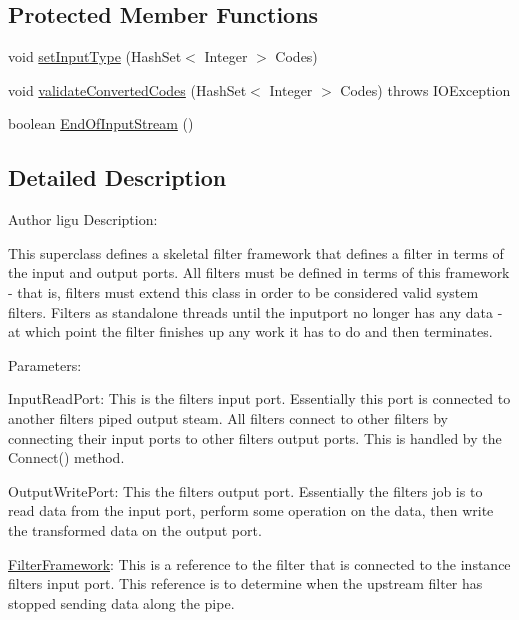 \subsection*{Protected Member Functions}
\begin{DoxyCompactItemize}
\item 
void \hyperlink{class_system_b_1_1_filter_framework_afa14d2ab9f4041b5be320ddc5ee7d08b}{set\+Input\+Type} (Hash\+Set$<$ Integer $>$ Codes)
\item 
void \hyperlink{class_system_b_1_1_filter_framework_aef76734b8963d3bf5284f77200bfce08}{validate\+Converted\+Codes} (Hash\+Set$<$ Integer $>$ Codes)  throws I\+O\+Exception
\item 
boolean \hyperlink{class_system_b_1_1_filter_framework_a54b1f53b591887bc653558919e694346}{End\+Of\+Input\+Stream} ()
\end{DoxyCompactItemize}


\subsection{Detailed Description}
\begin{DoxyAuthor}{Author}
ligu Description\+:
\end{DoxyAuthor}
This superclass defines a skeletal filter framework that defines a filter in terms of the input and output ports. All filters must be defined in terms of this framework -\/ that is, filters must extend this class in order to be considered valid system filters. Filters as standalone threads until the inputport no longer has any data -\/ at which point the filter finishes up any work it has to do and then terminates.

Parameters\+:

Input\+Read\+Port\+: This is the filter\textquotesingle{}s input port. Essentially this port is connected to another filter\textquotesingle{}s piped output steam. All filters connect to other filters by connecting their input ports to other filter\textquotesingle{}s output ports. This is handled by the Connect() method.

Output\+Write\+Port\+: This the filter\textquotesingle{}s output port. Essentially the filter\textquotesingle{}s job is to read data from the input port, perform some operation on the data, then write the transformed data on the output port.

\hyperlink{class_system_b_1_1_filter_framework}{Filter\+Framework}\+: This is a reference to the filter that is connected to the instance filter\textquotesingle{}s input port. This reference is to determine when the upstream filter has stopped sending data along the pipe.

